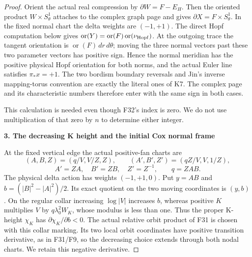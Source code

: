 \begin{proof}
Orient the actual real compression by \(\partial W=F-E_H\). Then the
oriented product \(W\times S^1_\theta\) attaches to the complex graph page and
gives \(\partial X=F\times S^1_\theta\). In the fixed normal chart the delta
weights are \((-1,+1)\). The direct Hopf computation below gives
\(\operatorname{or}(Y)=\operatorname{or}(F)\operatorname{or}(\nu_{\rm Hopf})\). At the outgoing trace the tangent orientation
is \(\operatorname{or}(F)\,dr\,d\theta\); moving the three normal vectors past these two
parameter vectors has positive sign. Hence the normal meridian has
the positive physical Hopf orientation for both norms, and the actual
Euler line satisfies \(\pi_* x=+1\). The two bordism boundary reversals
and Jin's inverse mapping-torus convention are exactly the literal
ones of K7. The complex page and its characteristic numbers therefore
enter with the same sign in both cases.

This calculation is needed even though F32's index is zero. We do not
use multiplication of that zero by \(n\) to determine either integer.

\par

\medskip\noindent\textbf{3. The decreasing K height and the initial Cox normal frame}

\par\nobreak

At the fixed vertical edge the actual positive-fan charts are
\[
 (A,B,Z)=(q/V,V/Z,Z),\qquad
 (A',B',Z')=(qZ/V,V,1/Z),
\]
\[
 A'=ZA,\quad B'=ZB,\quad Z'=Z^{-1},\qquad q=ZAB.
 \tag{OC.11}
\]
The physical delta action has weights \((-1,+1,0)\). Put
\(y=AB\) and \(b=(|B|^2-|A|^2)/2\). Its exact quotient on the two moving
coordinates is \((y,b)\). On the regular collar increasing \(\log|V|\)
increases \(b\), whereas positive \(K\) multiplies \(V\) by
\(q \lambda_0^2 W_K\), whose modulus is less than one. Thus the proper
K-height \(\chi_K\) has \(\partial\chi_K/\partial b<0\). The actual relative orbit product
of F31 is chosen with this collar marking. Its two local orbit
coordinates have positive transition derivative, as in F31/F9, so the
decreasing choice extends through both nodal charts. We retain this
negative derivative.


\end{proof}
